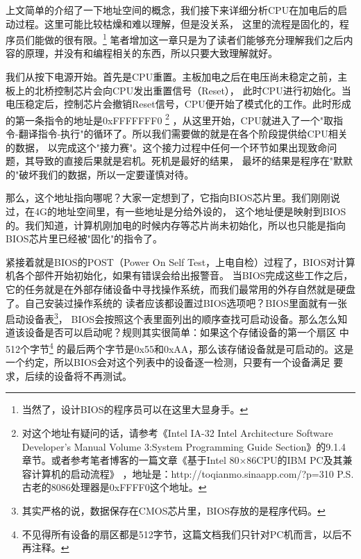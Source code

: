 \par 上文简单的介绍了一下地址空间的概念，我们接下来详细分析CPU在加电后的启动过程。这里可能比较枯燥和难以理解，但是没关系，\allowbreak
这里的流程是固化的，程序员们能做的很有限。\footnote{当然了，设计BIOS的程序员可以在这里大显身手。}\allowbreak
笔者增加这一章只是为了读者们能够充分理解我们之后内容的原理，并没有和编程相关的东西，所以只要大致理解就好。

\par 我们从按下电源开始。首先是CPU重置。主板加电之后在电压尚未稳定之前，主板上的北桥控制芯片会向CPU发出重置信号（Reset），\allowbreak
此时CPU进行初始化。当电压稳定后，控制芯片会撤销Reset信号，CPU便开始了模式化的工作。此时形成的第一条指令的地址是0xFFFFFFF0\allowbreak
\footnote{对这个地址有疑问的话，请参考《Intel IA-32 Intel Architecture Software Developer’s Manual Volume 3:System \allowbreak
Programming Guide Section》的9.1.4 章节。或者参考笔者博客的一篇文章《基于Intel 80×86CPU的IBM PC及其兼容计算机的启动流程》\allowbreak
，地址是：http://toqianmo.sinaapp.com/?p=310 P.S. 古老的8086处理器是0xFFFF0这个地址。}\allowbreak
，从这里开始，CPU就进入了一个"取指令-翻译指令-执行"的循环了。所以我们需要做的就是在各个阶段提供给CPU相关的数据，\allowbreak
以完成这个"接力赛"。这个接力过程中任何一个环节如果出现致命问题，其导致的直接后果就是宕机。死机是最好的结果，\allowbreak
最坏的结果是程序在"默默的"破坏我们的数据，所以一定要谨慎对待。

\par 那么，这个地址指向哪呢？大家一定想到了，它指向BIOS芯片里。我们刚刚说过，在4G的地址空间里，有一些地址是分给外设的，\allowbreak
这个地址便是映射到BIOS的。我们知道，计算机刚加电的时候内存等芯片尚未初始化，所以也只能是指向BIOS芯片里已经被"固化"的指令了。\allowbreak

\par 紧接着就是BIOS的POST（Power On Self Test，上电自检）过程了，BIOS对计算机各个部件开始初始化，如果有错误会给出报警音。\allowbreak
当BIOS完成这些工作之后，它的任务就是在外部存储设备中寻找操作系统，而我们最常用的外存自然就是硬盘了。自己安装过操作系统的\allowbreak
读者应该都设置过BIOS选项吧？BIOS里面就有一张启动设备表\footnote{其实严格的说，数据保存在CMOS芯片里，BIOS存放的是程序代码。}，\allowbreak
BIOS会按照这个表里面列出的顺序查找可启动设备。那么怎么知道该设备是否可以启动呢？规则其实很简单：如果这个存储设备的第一个扇区\allowbreak
中512个字节\footnote{不见得所有设备的扇区都是512字节，这篇文档我们只针对PC机而言，以后不再注释。}\allowbreak
的最后两个字节是0x55和0xAA，那么该存储设备就是可启动的。这是一个约定，所以BIOS会对这个列表中的设备逐一检测，只要有一个设备满足\allowbreak
要求，后续的设备将不再测试。

